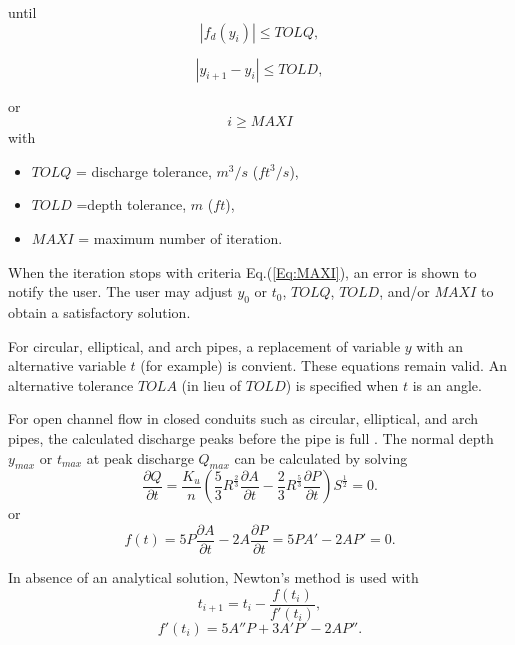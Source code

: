 \noindent until 
\begin{equation}  
|f_d(y_{i})| \leq TOLQ, 
\label{Eq:TOLQ}
\end{equation}

\begin{equation}  
|y_{i+1} - y_i| \leq TOLD, 
\label{Eq:TOLD}
\end{equation}

\noindent or 
\begin{equation}  
i \geq MAXI 
\label{Eq:MAXI}
\end{equation}
with 
\begin{itemize}
\item[] $TOLQ$ = discharge tolerance, $m^3/s$ ($ft^3/s$),
\item[] $TOLD$ =depth tolerance, $m$ ($ft$),
\item[] $MAXI$ = maximum number of iteration.
\end{itemize}

\noindent When the iteration stops with criteria Eq.(\ref{Eq:MAXI}), an error is shown to notify the user. The user may adjust $y_0$ or $t_0$, $TOLQ$, $TOLD$, and/or $MAXI$ to obtain a satisfactory solution. 

\noindent For circular, elliptical, and arch pipes, a replacement of variable $y$ with an alternative variable $t$ (for example) is convient. These equations remain valid. An alternative tolerance $TOLA$ (in lieu of $TOLD$) is specified when $t$ is an angle.

For open channel flow in closed conduits such as circular, elliptical, and arch pipes, the calculated discharge peaks before the pipe is full \cite{Chow1959,French1985,Munson2013}. 
The normal depth $y_{max}$ or $t_{max}$ at peak discharge $Q_{max}$ can be calculated by solving
\begin{equation}  
\frac{\partial Q}{\partial t} = \frac{K_u}{n} \left(\frac{5}{3}R^{\frac{2}{3}}\frac{\partial A}{\partial t} -  \frac{2}{3}R^{\frac{5}{3}}\frac{\partial P}{\partial t}\right) S^{\frac{1}{2}}=0.
\end{equation}
or
\begin{equation}  
f(t) = 5P\frac{\partial A}{\partial t} -  2 A\frac{\partial P}{\partial t} = 5PA' -  2 AP' = 0.
\label{Eq:MaxQ}
\end{equation}

\noindent In absence of an analytical solution, Newton's method is used with
\begin{equation}  
t _{i+1} = t _i - \frac{f(t _i)}{f'(t_i)},
\end{equation}
\begin{equation}  
f'(t_i) = 5A''P  + 3A'P' - 2AP''.
\end{equation}


